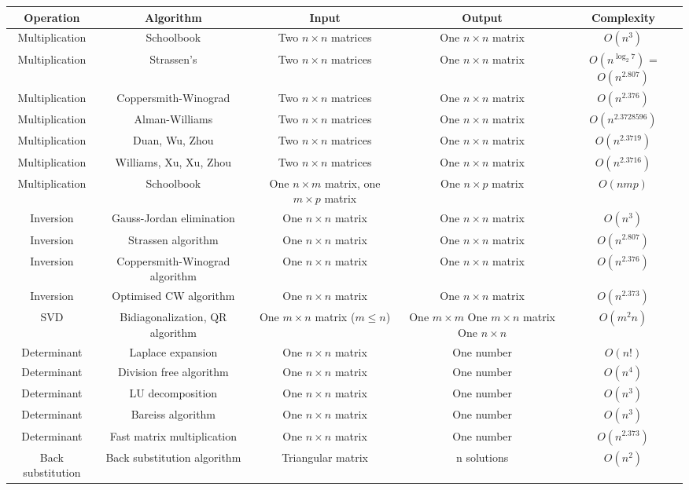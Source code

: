 \documentclass{article}
\begin{document}
\begin{table}[ht]
	\centering
	\scriptsize
	\begin{tabular}{c cccc}
		Operation & Algorithm & Input & Output & Complexity \\
		\hline
		Multiplication & Schoolbook & Two $n \times n$ matrices & One $n\times n$ matrix & $O(n^3)$ \\
		Multiplication &Strassen's & Two $n \times n$  matrices & One $n\times n$ matrix &$O(n^{\log_2{7}})$ = $O(n^{2.807})$\\
		Multiplication &Coppersmith-Winograd & Two $n \times n$  matrices & One $n\times n$ matrix &$O(n^{2.376})$\\
	    Multiplication &Alman-Williams & Two $n \times n$  matrices & One $n\times n$ matrix& $O(n^{2.3728596})$ \\
	    Multiplication &Duan, Wu, Zhou & Two $n \times n$  matrices & One $n\times n$ matrix& $O(n^{2.3719})$ \\
	    Multiplication &Williams, Xu, Xu, Zhou & Two $n \times n$  matrices & One $n\times n$ matrix& $O(n^{2.3716})$ \\
		Multiplication &Schoolbook & One $n\times m$ matrix, one $m\times p$ matrix & One $n\times p$ matrix& $O(nmp)$  \\
		Inversion &Gauss-Jordan elimination & One $n\times n$ matrix & One $n\times n$ matrix& $O(n^3)$  \\
		Inversion &Strassen algorithm & One $n\times n$ matrix & One $n\times n$ matrix& $O(n^{2.807})$  \\
		Inversion &Coppersmith-Winograd algorithm & One $n\times n$ matrix & One $n\times n$ matrix& $O(n^{2.376})$ \\
		Inversion &Optimised CW algorithm & One $n\times n$ matrix & One $n\times n$ matrix& $O(n^{2.373})$  \\
		SVD &Bidiagonalization, QR algorithm & One $m\times n$ matrix ($m\leq n$)& \makecell {One $m\times m$ \\ One $m \times n$ matrix \\ One $n \times n$} & $O(m^2n)$  \\
		Determinant &Laplace expansion & One $n\times n$ matrix & One number & $O(n!)$ \\
		Determinant & Division free algorithm & One $n\times n$ matrix & One number & $O(n^4)$ \\
		Determinant & LU decomposition & One $n\times n$ matrix & One number & $O(n^3)$ \\
		Determinant & Bareiss algorithm & One $n\times n$ matrix & One number & $O(n^3)$ \\
		Determinant & Fast matrix multiplication & One $n\times n$ matrix & One number & $O(n^{2.373})$ \\
		Back substitution & Back substitution algorithm & Triangular matrix & n solutions & $O(n^2)$ \\
		\hline
	\end{tabular}
\end{table}
\end{document}
